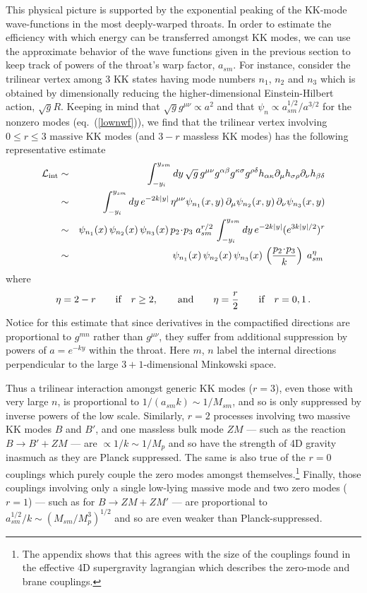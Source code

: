 \documentclass[12pt]{JHEP3}
\def\beq{\begin{equation}}
\def\eeq{\end{equation}}
\def\beqa{\begin{eqnarray}}
\def\eeqa{\end{eqnarray}}
\begin{document}
This physical picture is supported by the exponential peaking of
the KK-mode wave-functions in the most deeply-warped throats. In
order to estimate the efficiency with which energy can be
transferred amongst KK modes, we can use the approximate behavior
of the wave functions given in the previous section to keep track
of powers of the throat's warp factor, $a_{sm}$. For instance,
consider the trilinear vertex among 3 KK states having mode
numbers $n_1$, $n_2$ and $n_3$ which is obtained by dimensionally
reducing the higher-dimensional Einstein-Hilbert action,
$\sqrt{g}R$. Keeping in mind that $\sqrt{g} g^{\mu\nu} \propto
a^2$ and that $\psi_n \propto a_{sm}^{1/2}/a^{3/2}$ for the
nonzero modes (eq.\ (\ref{lownwf})), we find that the trilinear
vertex involving $0 \le r \le 3$ massive KK modes (and $3-r$
massless KK modes) has the following representative estimate
%
\beqa
    {\cal L}_{\rm int} &\sim& \int^{y_{sm}}_{-y_i} dy \, \sqrt{g}
    \, g^{\mu\nu} g^{\alpha\beta} g^{\kappa\sigma} g^{\rho\delta}
    h_{\alpha\kappa} \partial_\mu h_{\sigma\rho} \partial_\nu
    h_{\beta\delta} \nonumber \\
    &\sim& \int^{y_{sm}}_{-y_i} dy\, e^{-2k|y|}\, \eta^{\mu\nu}
    \psi_{n_1}(x,y)\,
    \partial_\mu \psi_{n_2}(x,y)\, \partial_\nu
    \psi_{n_3}(x,y) \nonumber\\
    &\sim&   \psi_{n_1}(x)\, \psi_{n_2}(x)\, \psi_{n_3}(x)\,
     p_2\!\cdot\!p_3\; a_{sm}^{r/2} \,
     \int^{y_{sm}}_{-y_i} dy\, e^{-2k|y|}
     (e^{3k|y|/2})^r \nonumber\\
    &\sim& \psi_{n_1}(x)\,
    \psi_{n_2}(x)\,\psi_{n_3}(x)\, \left(
    \frac{p_2\!\cdot\!p_3}{k}
    \right) \; a_{sm}^{\eta} \,
\eeqa
%
where
%
\beq
    \eta = 2-r \qquad \hbox{if} \quad r \ge 2, \qquad \hbox{and}
    \qquad \eta = \frac{r}{2} \qquad \hbox{if} \quad r = 0,1  \,.
\eeq
%
Notice for this estimate that since derivatives in the
compactified directions are proportional to $g^{mn}$ rather than
$g^{\mu\nu}$, they suffer from additional suppression by powers of
$a = e^{-ky}$ within the throat. Here $m$, $n$ label the internal
directions perpendicular to the large $3+1$-dimensional Minkowski
space.

Thus a trilinear interaction amongst generic KK modes ($r=3$),
even those with very large $n$, is proportional to $1/(a_{sm} k)
\sim 1/M_{sm}$, and so is only suppressed by inverse powers of the
low scale. Similarly, $r=2$ processes involving two massive KK
modes $B$ and $B'$, and one massless bulk mode $ZM$ --- such as
the reaction $B \to B' + ZM$ --- are $\propto 1/k \sim 1/M_p$ and
so have the strength of 4D gravity inasmuch as they are Planck
suppressed. The same is also true of the $r=0$ couplings which
purely couple the zero modes amongst themselves.\footnote{The
appendix shows that this agrees with the size of the couplings
found in the effective 4D supergravity lagrangian which describes
the zero-mode and brane couplings.} Finally, those couplings
involving only a single low-lying massive mode and two zero modes
($r = 1$) --- such as for $B \to ZM + ZM'$
--- are proportional to $a_{sm}^{1/2}/k \sim (M_{sm}/M_p^3)^{1/2}$
and so are even weaker than Planck-suppressed.
\end{document}
